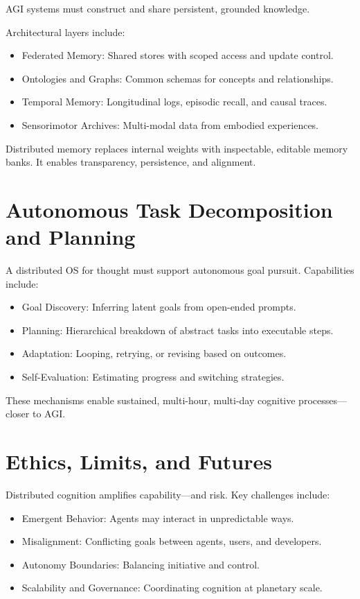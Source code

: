 \documentclass{book}
\begin{document}
AGI systems must construct and share persistent, grounded knowledge.

Architectural layers include:

\begin{itemize}
  \item Federated Memory: Shared stores with scoped access and update control.
  \item Ontologies and Graphs: Common schemas for concepts and relationships.
  \item Temporal Memory: Longitudinal logs, episodic recall, and causal traces.
  \item Sensorimotor Archives: Multi-modal data from embodied experiences.
\end{itemize}

Distributed memory replaces internal weights with inspectable, editable memory banks. It enables transparency, persistence, and alignment.

\section{Autonomous Task Decomposition and Planning}

A distributed OS for thought must support autonomous goal pursuit. Capabilities include:

\begin{itemize}
  \item Goal Discovery: Inferring latent goals from open-ended prompts.
  \item Planning: Hierarchical breakdown of abstract tasks into executable steps.
  \item Adaptation: Looping, retrying, or revising based on outcomes.
  \item Self-Evaluation: Estimating progress and switching strategies.
\end{itemize}

These mechanisms enable sustained, multi-hour, multi-day cognitive processes—closer to AGI.

\section{Ethics, Limits, and Futures}

Distributed cognition amplifies capability—and risk. Key challenges include:

\begin{itemize}
  \item Emergent Behavior: Agents may interact in unpredictable ways.
  \item Misalignment: Conflicting goals between agents, users, and developers.
  \item Autonomy Boundaries: Balancing initiative and control.
  \item Scalability and Governance: Coordinating cognition at planetary scale.
\end{itemize}
\end{document}
